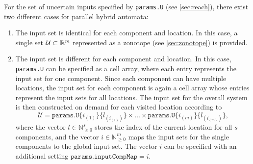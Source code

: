 For the set of uncertain inputs specified by \texttt{params.U} (see \cref{sec:reach}), there exist two different cases for parallel hybrid automata:
\begin{enumerate}
	\item The input set is identical for each component and location. In this case, a single set $\mathcal{U} \subset \mathbb{R}^m$ represented as a zonotope (see \cref{sec:zonotope}) is provided.
	\item The input set is different for each component and location. In this case, \texttt{params.U} can be specified as a cell array, where each entry represents the input set for one component. Since each component can have multiple locations, the input set for each component is again a cell array whose entries represent the input sets for all locations. The input set for the overall system is then constructed on demand for each visited location according to
	\begin{equation*}
		\mathcal{U} = \texttt{params.U\{}i_{(1)}\texttt{\}\{}l_{(i_{(1)})} \texttt{\}} \times \dots \times \texttt{params.U\{}i_{(m)}\texttt{\}\{}l_{(i_{(m)})} \texttt{\}} ,
	\end{equation*}
	where the vector $l \in \mathbb{N}_{\geq 0}^s$ stores the index of the current location for all $s$ components, and the vector $i \in \mathbb{N}_{\geq 0}^m$ maps the input sets for the single components to the global input set. The vector $i$ can be specified with an additional setting $\texttt{params.inputCompMap} = i$. 
\end{enumerate}
